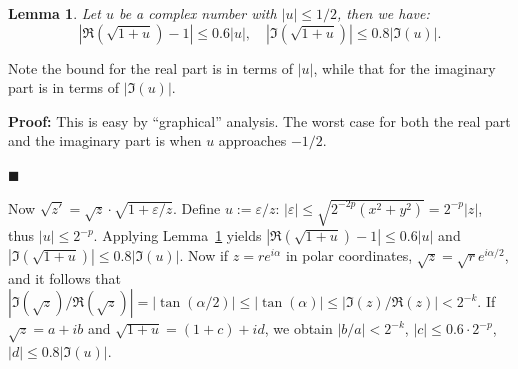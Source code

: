 \documentclass [11pt]{article}
\renewcommand {\epsilon}{\varepsilon}
\newtheorem{lemma}[theorem]{Lemma}
\newenvironment{proof}{\noindent \textbf {Proof:}}{{\hspace* {\fill}$\blacksquare$}}
\begin{document}
\begin{lemma} \label{lem:sqrtaux}
  Let $u$ be a complex number with $|u| \le 1/2$, then we have:
  \[ |\Re(\sqrt{1+u})-1| \le 0.6 |u|, \quad |\Im(\sqrt{1+u})| \le 0.8 |\Im(u)|. \]
\end{lemma}
Note the bound for the real part is in terms of $|u|$, while that for the imaginary
part is in terms of $|\Im(u)|$.

\begin{proof}
  This is easy by ``graphical'' analysis. The worst case for both the real part
  and the imaginary part is when $u$ approaches $-1/2$.

\end{proof}

Now $\sqrt{z'} = \sqrt{z} \cdot \sqrt{1+\epsilon/z}$.
Define $u := \epsilon/z$:
$|\epsilon| \le \sqrt{2^{-2p} (x^2 + y^2)} = 2^{-p} |z|$,
thus $|u| \le 2^{-p}$.
Applying Lemma~\ref{lem:sqrtaux}
yields $|\Re(\sqrt{1+u})-1| \le 0.6 |u|$ and
$|\Im(\sqrt{1+u})| \le 0.8 |\Im(u)|$.
Now if $z = r e^{i\alpha}$ in polar coordinates,
$\sqrt{z} = \sqrt{r} e^{i\alpha/2}$, and it follows that
$|\Im(\sqrt{z})/\Re(\sqrt{z})| = |\tan(\alpha/2)| \le |\tan(\alpha)|
\le |\Im(z)/\Re(z)| < 2^{-k}$.
If $\sqrt{z} = a+ib$ and $\sqrt{1+u} = (1+c)+id$, we obtain
$|b/a| < 2^{-k}$, $|c| \le 0.6 \cdot 2^{-p}$, $|d| \le 0.8 |\Im(u)|$.
\end{document}
